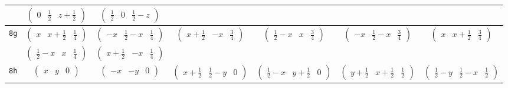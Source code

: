 \documentclass[fleqn,9pt,landscape]{jsarticle}
\begin{document}
\begin{center}
\begin{longtable}{ccccccc}
& $ \begin{pmatrix} 0 & \frac{1}{2} & z + \frac{1}{2} \end{pmatrix} $ & $ \begin{pmatrix} \frac{1}{2} & 0 & \frac{1}{2} - z \end{pmatrix} $ & $  $ & $  $ & $  $ & $  $ \\ \hline
{\tt 8g} & $ \begin{pmatrix} x & x + \frac{1}{2} & \frac{1}{4} \end{pmatrix} $ & $ \begin{pmatrix} - x & \frac{1}{2} - x & \frac{1}{4} \end{pmatrix} $ & $ \begin{pmatrix} x + \frac{1}{2} & - x & \frac{3}{4} \end{pmatrix} $ & $ \begin{pmatrix} \frac{1}{2} - x & x & \frac{3}{4} \end{pmatrix} $ & $ \begin{pmatrix} - x & \frac{1}{2} - x & \frac{3}{4} \end{pmatrix} $ & $ \begin{pmatrix} x & x + \frac{1}{2} & \frac{3}{4} \end{pmatrix} $ \\
& $ \begin{pmatrix} \frac{1}{2} - x & x & \frac{1}{4} \end{pmatrix} $ & $ \begin{pmatrix} x + \frac{1}{2} & - x & \frac{1}{4} \end{pmatrix} $ & $  $ & $  $ & $  $ & $  $ \\ \hline
{\tt 8h} & $ \begin{pmatrix} x & y & 0 \end{pmatrix} $ & $ \begin{pmatrix} - x & - y & 0 \end{pmatrix} $ & $ \begin{pmatrix} x + \frac{1}{2} & \frac{1}{2} - y & 0 \end{pmatrix} $ & $ \begin{pmatrix} \frac{1}{2} - x & y + \frac{1}{2} & 0 \end{pmatrix} $ & $ \begin{pmatrix} y + \frac{1}{2} & x + \frac{1}{2} & \frac{1}{2} \end{pmatrix} $ & $ \begin{pmatrix} \frac{1}{2} - y & \frac{1}{2} - x & \frac{1}{2} \end{pmatrix} $ \\

\end{longtable}
\end{center}
\end{document}

